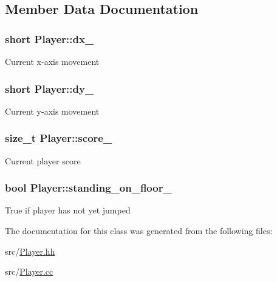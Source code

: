 \subsection{Member Data Documentation}
\hypertarget{classPlayer_a24f9dd9a89dc11513ed416dfaa27743b}{
\subsubsection[{dx\-\_\-}]{\setlength{\rightskip}{0pt plus 5cm}short Player\-::dx\-\_\-\hspace{0.3cm}{\ttfamily [private]}}}\label{classPlayer_a24f9dd9a89dc11513ed416dfaa27743b}
Current x-\/axis movement \hypertarget{classPlayer_a744cf17a4642fef56b8fe34abdfe9b74}{
\subsubsection[{dy\-\_\-}]{\setlength{\rightskip}{0pt plus 5cm}short Player\-::dy\-\_\-\hspace{0.3cm}{\ttfamily [private]}}}\label{classPlayer_a744cf17a4642fef56b8fe34abdfe9b74}
Current y-\/axis movement \hypertarget{classPlayer_a886bb5b698fe05279fc3b2b40be11730}{
\subsubsection[{score\-\_\-}]{\setlength{\rightskip}{0pt plus 5cm}size\-\_\-t Player\-::score\-\_\-\hspace{0.3cm}{\ttfamily [private]}}}\label{classPlayer_a886bb5b698fe05279fc3b2b40be11730}
Current player score \hypertarget{classPlayer_af64bce8749b5148e518390dea7387ce7}{
\subsubsection[{standing\-\_\-on\-\_\-floor\-\_\-}]{\setlength{\rightskip}{0pt plus 5cm}bool Player\-::standing\-\_\-on\-\_\-floor\-\_\-\hspace{0.3cm}{\ttfamily [private]}}}\label{classPlayer_af64bce8749b5148e518390dea7387ce7}
True if player has not yet jumped 

The documentation for this class was generated from the following files\-:\begin{DoxyCompactItemize}
\item 
src/\hyperlink{Player_8hh}{Player.\-hh}\item 
src/\hyperlink{Player_8cc}{Player.\-cc}\end{DoxyCompactItemize}
